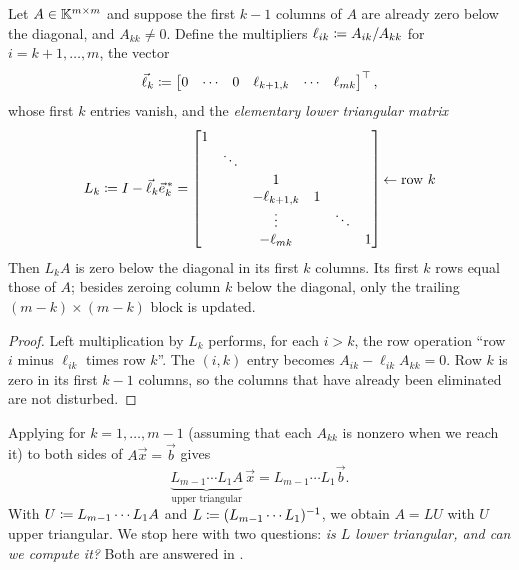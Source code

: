 \begin{theorem}
  \label{thm:elim}
  Let $A \in \mathbb{K}^{m \times m}$ and suppose the first $k - 1$ columns of $A$ are already zero below the diagonal, and $A_{kk} \ne 0$. Define the multipliers $\ell_{ik} \coloneqq A_{ik}/A_{kk}$ for $i = k + 1, \dots, m$, the vector
  \begin{equation}
    \vec{\ell}_k \coloneqq \begin{bmatrix} 0 & \cdots & 0 & \ell_{k+1,k} & \cdots & \ell_{mk} \end{bmatrix}^\top,
  \end{equation}
  whose first $k$ entries vanish, and the \emph{elementary lower triangular matrix}
  \begin{equation}
    L_k \coloneqq I - \vec{\ell}_k \vec{e}_k^{\,\ast} =
    \begin{bmatrix}
      1 & & & & & \\
      & \ddots & & & & \\
      & & 1 & & & \\
      & & -\ell_{k+1,k} & 1 & & \\
      & & \vdots & & \ddots & \\
      & & -\ell_{mk} & & & 1
    \end{bmatrix}
    \begin{matrix} \\ \\ \leftarrow \text{row } k \\ \\ \\ \\ \end{matrix}
  \end{equation}
  Then $L_k A$ is zero below the diagonal in its first $k$ columns. Its first $k$ rows equal those of $A$; besides zeroing column $k$ below the diagonal, only the trailing $(m - k) \times (m - k)$ block is updated.
\end{theorem}

\begin{proof}
  Left multiplication by $L_k$ performs, for each $i > k$, the row operation ``row $i$ minus $\ell_{ik}$ times row $k$''. The $(i, k)$ entry becomes $A_{ik} - \ell_{ik}A_{kk} = 0$. Row $k$ is zero in its first $k - 1$ columns, so the columns that have already been eliminated are not disturbed.
\end{proof}

Applying  for $k = 1, \dots, m - 1$ (assuming that each $A_{kk}$ is nonzero when we reach it) to both sides of $A\vec{x} = \vec{b}$ gives
\begin{equation}
  \underbrace{L_{m-1} \cdots L_1 A}_{\text{upper triangular}}\,\vec{x} = L_{m-1} \cdots L_1 \vec{b}.
\end{equation}
With $U \coloneqq L_{m-1} \cdots L_1 A$ and $L \coloneqq (L_{m-1} \cdots L_1)^{-1}$, we obtain $A = LU$ with $U$ upper triangular. We stop here with two questions: \emph{is $L$ lower triangular, and can we compute it?} Both are answered in .

